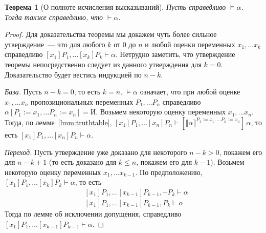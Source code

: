 \documentclass[a4paper,11pt]{article}
\newtheorem{thm}{Теорема}[section]
\theoremstyle{definition}
\newcommand{\sem}[2]{\llbracket #1 \rrbracket^{#2}}
\newcommand{\proves}{\vdash}
\newcommand{\True}{\text{И}}
\begin{document}
\begin{thm}[О полноте исчисления высказываний]
Пусть справедливо $\models \alpha$. Тогда также справедливо, что $\proves
\alpha$.
\end{thm}
\begin{proof}
Для доказательства теоремы мы докажем чуть более сильное утверждение~--- что
для любого $k$ от $0$ до $n$ и любой оценки переменных $x_1, \dots x_k$
справедливо $[x_1]P_1, \dots [x_k]P_k \proves \alpha$. Нетрудно заметить, что
утверждение теоремы непосредственно следует из данного утверждения для $k = 0$.
Доказательство будет вестись индукцией по $n - k$.

\emph{База.} Пусть $n - k = 0$, то есть $k = n$. $\models \alpha$ означает, что
при любой оценке $x_1, \dots x_n$ пропозициональных переменных $P_1, \dots P_n$
справедливо $\alpha[P_1 := x_1, \dots P_n := x_n] = \True$. Возьмем некоторую
оценку переменных $x_1, \dots x_n$. Тогда, по лемме~\ref{lmm:truthtable},
$[x_1]P_1, \dots [x_n]P_n \proves [\sem{\alpha}{P_1:=x_1,\dots P_n:=x_n}]\,\alpha$,
то есть $[x_1]P_1, \dots [x_n]P_n \proves \alpha$.

\emph{Переход.} Пусть утверждение уже доказано для некоторого $n - k > 0$,
покажем его для $n - k + 1$ (то есть доказано для $k \le n$, покажем его для
$k - 1$). Возьмем некоторую оценку переменных $x_1, \dots x_{k-1}$. По
предположению, $[x_1]P_1, \dots [x_k]P_k \proves \alpha$, то есть
\begin{align*}
&[x_1]P_1, \dots [x_{k-1}]P_{k-1}, \neg P_k \proves \alpha\\
&[x_1]P_1, \dots [x_{k-1}]P_{k-1}, P_k \proves \alpha
\end{align*}
Тогда по лемме об исключении допущения, справедливо $[x_1]P_1, \dots
[x_{k-1}]P_{k-1} \proves \alpha$.
\end{proof}
\end{document}

